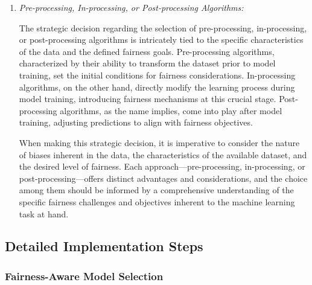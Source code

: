 \documentclass[12pt,a4paper,openright,twoside]{book}
\begin{document}
\begin{enumerate}
    \item \emph{Pre-processing, In-processing, or Post-processing Algorithms:} 
    
    The strategic decision regarding the selection of pre-processing, in-processing, or post-processing algorithms is intricately tied to the specific characteristics of the data and the defined fairness goals. Pre-processing algorithms, characterized by their ability to transform the dataset prior to model training, set the initial conditions for fairness considerations. In-processing algorithms, on the other hand, directly modify the learning process during model training, introducing fairness mechanisms at this crucial stage. Post-processing algorithms, as the name implies, come into play after model training, adjusting predictions to align with fairness objectives.

    When making this strategic decision, it is imperative to consider the nature of biases inherent in the data, the characteristics of the available dataset, and the desired level of fairness. Each approach—pre-processing, in-processing, or post-processing—offers distinct advantages and considerations, and the choice among them should be informed by a comprehensive understanding of the specific fairness challenges and objectives inherent to the machine learning task at hand.

\end{enumerate}

\subsection{Detailed Implementation Steps}


\subsubsection{Fairness-Aware Model Selection}
\end{document}
